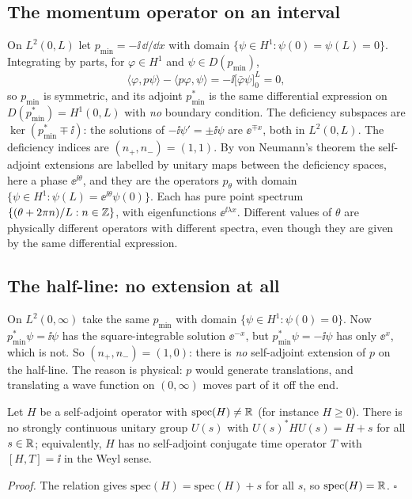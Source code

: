 \subsection{The momentum operator on an interval}
On $L^2(0,L)$ let $p_{\min}=-\ii\,\dd/\dd x$ with domain $\{\psi\in H^1:\psi(0)=\psi(L)=0\}$. Integrating by parts, for $\varphi\in H^1$ and $\psi\in D(p_{\min})$,
\begin{equation}
\langle\varphi,p\psi\rangle-\langle p\varphi,\psi\rangle=-\ii\big[\bar\varphi\psi\big]_0^L=0,
\end{equation}
so $p_{\min}$ is symmetric, and its adjoint $p_{\min}^*$ is the same differential expression on $D(p_{\min}^*)=H^1(0,L)$ with \emph{no} boundary condition. The deficiency subspaces are $\ker(p_{\min}^*\mp\ii)$: the solutions of $-\ii\psi'=\pm\ii\psi$ are $\ee^{\mp x}$, both in $L^2(0,L)$. The deficiency indices are $(n_+,n_-)=(1,1)$. By von Neumann's theorem the self-adjoint extensions are labelled by unitary maps between the deficiency spaces, here a phase $\ee^{\ii\theta}$, and they are the operators $p_\theta$ with domain $\{\psi\in H^1:\psi(L)=\ee^{\ii\theta}\psi(0)\}$. Each has pure point spectrum $\{(\theta+2\pi n)/L:n\in\mathbb{Z}\}$, with eigenfunctions $\ee^{\ii\lambda x}$. Different values of $\theta$ are physically different operators with different spectra, even though they are given by the same differential expression.

\subsection{The half-line: no extension at all}
On $L^2(0,\infty)$ take the same $p_{\min}$ with domain $\{\psi\in H^1:\psi(0)=0\}$. Now $p_{\min}^*\psi=\ii\psi$ has the square-integrable solution $\ee^{-x}$, but $p_{\min}^*\psi=-\ii\psi$ has only $\ee^{x}$, which is not. So $(n_+,n_-)=(1,0)$: there is \emph{no} self-adjoint extension of $p$ on the half-line. The reason is physical: $p$ would generate translations, and translating a wave function on $(0,\infty)$ moves part of it off the end.

\begin{theorem}[Pauli]
Let $H$ be a self-adjoint operator with $\mathrm{spec}(H)\ne\mathbb{R}$ (for instance $H\ge0$). There is no strongly continuous unitary group $U(s)$ with $U(s)^*HU(s)=H+s$ for all $s\in\mathbb{R}$; equivalently, $H$ has no self-adjoint conjugate time operator $T$ with $[H,T]=\ii$ in the Weyl sense.
\end{theorem}
\emph{Proof.} The relation gives $\mathrm{spec}(H)=\mathrm{spec}(H)+s$ for all $s$, so $\mathrm{spec}(H)=\mathbb{R}$. \hfill$\square$

